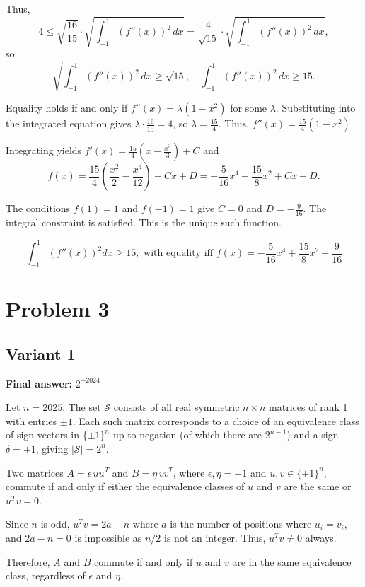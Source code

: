 \documentclass[12pt,a4paper]{article}
\theoremstyle{definition}
\begin{document}
    Thus,
    \[
        4 \leq \sqrt{\frac{16}{15}} \cdot \sqrt{\int_{-1}^{1} (f''(x))^2 \, dx} = \frac{4}{\sqrt{15}} \cdot \sqrt{\int_{-1}^{1} (f''(x))^2 \, dx},
    \]
    so
    \[
        \sqrt{\int_{-1}^{1} (f''(x))^2 \, dx} \geq \sqrt{15}, \quad \int_{-1}^{1} (f''(x))^2 \, dx \geq 15.
    \]

    Equality holds if and only if $f''(x) = \lambda (1 - x^2)$ for some $\lambda$. Substituting into the integrated equation gives $\lambda \cdot \frac{16}{15} = 4$, so $\lambda = \frac{15}{4}$. Thus, $f''(x) = \frac{15}{4} (1 - x^2)$.

    Integrating yields $f'(x) = \frac{15}{4} \left( x - \frac{x^3}{3} \right) + C$ and
    \[
        f(x) = \frac{15}{4} \left( \frac{x^2}{2} - \frac{x^4}{12} \right) + C x + D = -\frac{5}{16} x^4 + \frac{15}{8} x^2 + C x + D.
    \]

    The conditions $f(1) = 1$ and $f(-1) = 1$ give $C = 0$ and $D = -\frac{9}{16}$. The integral constraint is satisfied. This is the unique such function.

    \[
        \boxed{\int_{-1}^{1} (f''(x))^{2} dx \geq 15, \text{ with equality iff } f(x)=-\frac{5}{16}x^{4}+\frac{15}{8}x^{2}-\frac{9}{16}}
    \]

  \section{Problem 3}
\subsection{Variant 1}
    \textbf{Final answer:} $2^{-2024}$

    Let $n = 2025$. The set $\mathcal{S}$ consists of all real symmetric $n \times n$ matrices of rank 1 with entries $\pm 1$. Each such matrix corresponds to a choice of an equivalence class of sign vectors in $\{\pm 1\}^n$ up to negation (of which there are $2^{n-1}$) and a sign $\delta = \pm 1$, giving $|\mathcal{S}| = 2^n$.

    Two matrices $A = \epsilon \, u u^T$ and $B = \eta \, v v^T$, where $\epsilon, \eta = \pm 1$ and $u, v \in \{\pm 1\}^n$, commute if and only if either the equivalence classes of $u$ and $v$ are the same or $u^T v = 0$.

    Since $n$ is odd, $u^T v = 2a - n$ where $a$ is the number of positions where $u_i = v_i$, and $2a - n = 0$ is impossible as $n/2$ is not an integer. Thus, $u^T v \neq 0$ always.

    Therefore, $A$ and $B$ commute if and only if $u$ and $v$ are in the same equivalence class, regardless of $\epsilon$ and $\eta$.
\end{document}
